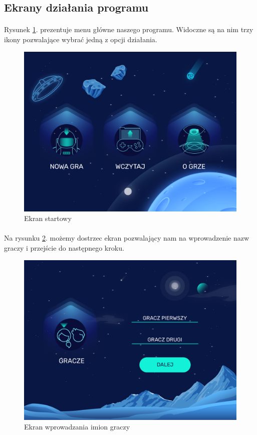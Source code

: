\documentclass[a4paper]{article}
\begin{document}
\newpage

\subsection{Ekrany działania programu}
\paragraph{}Rysunek \ref{fig:start}. prezentuje menu główne naszego programu. Widoczne są na nim trzy ikony pozwalające wybrać jedną z opcji działania.
\begin{figure}[H]
    \centering
    \includegraphics[width=1\textwidth]{img/ekran-start.png}
    \caption{Ekran startowy}
    \label{fig:start}
\end{figure}

\newpage

\paragraph{}Na rysunku \ref{fig:gracze}. możemy dostrzec ekran pozwalający nam na wprowadzenie nazw graczy i przejście do następnego kroku.
\begin{figure}[H]
    \centering
    \includegraphics[width=1\textwidth]{img/ekran-gracze.png}
    \caption{Ekran wprowadzania imion graczy}
    \label{fig:gracze}
\end{figure}
\end{document}
